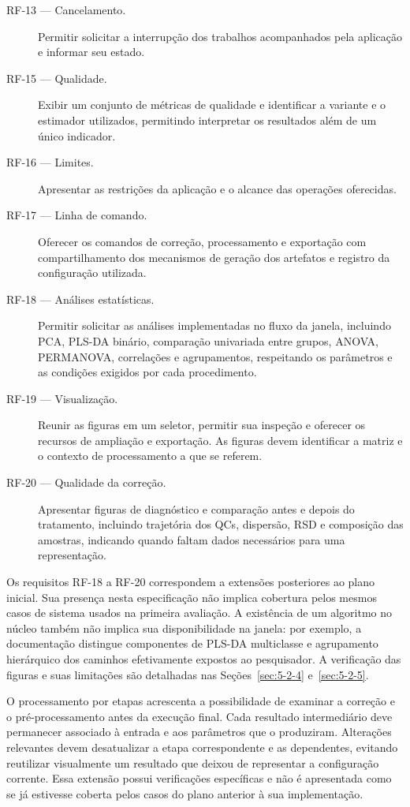 \begin{description}
\item[RF-13 --- Cancelamento.] Permitir solicitar a interrupção dos trabalhos acompanhados pela aplicação e informar seu estado.
\item[RF-15 --- Qualidade.] Exibir um conjunto de métricas de qualidade e identificar a variante e o estimador utilizados, permitindo interpretar os resultados além de um único indicador.
\item[RF-16 --- Limites.] Apresentar as restrições da aplicação e o alcance das operações oferecidas.
\item[RF-17 --- Linha de comando.] Oferecer os comandos de correção, processamento e exportação com compartilhamento dos mecanismos de geração dos artefatos e registro da configuração utilizada.
\item[RF-18 --- Análises estatísticas.] Permitir solicitar as análises implementadas no fluxo da janela, incluindo PCA, PLS-DA binário, comparação univariada entre grupos, ANOVA, PERMANOVA, correlações e agrupamentos, respeitando os parâmetros e as condições exigidos por cada procedimento.
\item[RF-19 --- Visualização.] Reunir as figuras em um seletor, permitir sua inspeção e oferecer os recursos de ampliação e exportação. As figuras devem identificar a matriz e o contexto de processamento a que se referem.
\item[RF-20 --- Qualidade da correção.] Apresentar figuras de diagnóstico e comparação antes e depois do tratamento, incluindo trajetória dos QCs, dispersão, RSD e composição das amostras, indicando quando faltam dados necessários para uma representação.
\end{description}

Os requisitos RF-18 a RF-20 correspondem a extensões posteriores ao plano inicial. Sua presença nesta especificação não implica cobertura pelos mesmos casos de sistema usados na primeira avaliação. A existência de um algoritmo no núcleo também não implica sua disponibilidade na janela: por exemplo, a documentação distingue componentes de PLS-DA multiclasse e agrupamento hierárquico dos caminhos efetivamente expostos ao pesquisador. A verificação das figuras e suas limitações são detalhadas nas Seções~\ref{sec:5-2-4} e~\ref{sec:5-2-5}.

O processamento por etapas acrescenta a possibilidade de examinar a correção e o pré-processamento antes da execução final. Cada resultado intermediário deve permanecer associado à entrada e aos parâmetros que o produziram. Alterações relevantes devem desatualizar a etapa correspondente e as dependentes, evitando reutilizar visualmente um resultado que deixou de representar a configuração corrente. Essa extensão possui verificações específicas e não é apresentada como se já estivesse coberta pelos casos do plano anterior à sua implementação.

